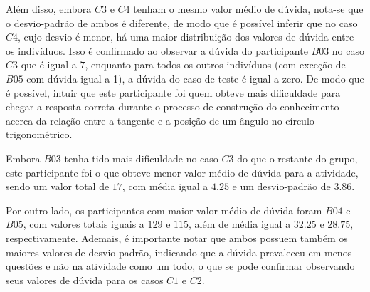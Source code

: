 Além disso, embora $C3$ e $C4$ tenham o mesmo valor médio de dúvida, nota-se que o desvio-padrão de ambos é diferente, de modo que é possível inferir que no caso $C4$, cujo desvio é menor, há uma maior distribuição dos valores de dúvida entre os indivíduos. Isso é confirmado ao observar a dúvida do participante $B03$ no caso $C3$ que é igual a $7$, enquanto para todos os outros indivíduos (com exceção de $B05$ com dúvida igual a 1), a dúvida do caso de teste é igual a zero. De modo que é possível, intuir que este participante foi quem obteve mais dificuldade para chegar a resposta correta durante o processo de construção do conhecimento acerca da relação entre a tangente e a posição de um ângulo no círculo trigonométrico.

Embora $B03$ tenha tido mais dificuldade no caso $C3$ do que o restante do grupo, este participante foi o que obteve menor valor médio de dúvida para a atividade, sendo um valor total de $17$, com média igual a $4.25$ e um desvio-padrão de $3.86$. 

Por outro lado, os participantes com maior valor médio de dúvida foram $B04$ e $B05$, com valores totais iguais a $129$ e $115$, além de média igual a $32.25$ e $28.75$, respectivamente. Ademais, é importante notar que ambos possuem também os maiores valores de desvio-padrão, indicando que a dúvida prevaleceu em menos questões e não na atividade como um todo, o que se pode confirmar observando seus valores de dúvida para os casos $C1$ e $C2$.


